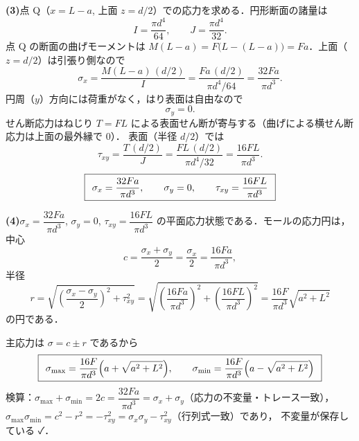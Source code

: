 \documentclass[11pt,a4paper]{article}
\begin{document}
\medskip
\noindent\textbf{(3)}\quad 点 Q（$x=L-a$, 上面 $z=d/2$）での応力を求める．円形断面の諸量は
\[
  I=\frac{\pi d^4}{64},\qquad J=\frac{\pi d^4}{32}.
\]
点 Q の断面の曲げモーメントは $M(L-a)=F\big(L-(L-a)\big)=Fa$．上面（$z=d/2$）は引張り側なので
\[
  \sigma_x=\frac{M(L-a)\,(d/2)}{I}=\frac{Fa\,(d/2)}{\pi d^4/64}=\frac{32Fa}{\pi d^3}.
\]
円周（$y$）方向には荷重がなく，はり表面は自由なので
\[
  \sigma_y=0 .
\]
せん断応力はねじり $T=FL$ による表面せん断が寄与する（曲げによる横せん断応力は上面の最外縁で 0）．
表面（半径 $d/2$）では
\[
  \tau_{xy}=\frac{T\,(d/2)}{J}=\frac{FL\,(d/2)}{\pi d^4/32}=\frac{16FL}{\pi d^3}.
\]
\[
  \boxed{\,\;\sigma_x=\frac{32Fa}{\pi d^3},\qquad \sigma_y=0,\qquad \tau_{xy}=\frac{16FL}{\pi d^3}\;\,}
\]

\medskip
\noindent\textbf{(4)}\quad $\sigma_x=\dfrac{32Fa}{\pi d^3}$, $\sigma_y=0$, $\tau_{xy}=\dfrac{16FL}{\pi d^3}$
の平面応力状態である．モールの応力円は，中心
\[
  c=\frac{\sigma_x+\sigma_y}{2}=\frac{\sigma_x}{2}=\frac{16Fa}{\pi d^3},
\]
半径
\[
  r=\sqrt{\left(\frac{\sigma_x-\sigma_y}{2}\right)^2+\tau_{xy}^2}
   =\sqrt{\left(\frac{16Fa}{\pi d^3}\right)^2+\left(\frac{16FL}{\pi d^3}\right)^2}
   =\frac{16F}{\pi d^3}\sqrt{a^2+L^2}
\]
の円である．

\begin{center}
\end{center}

主応力は $\sigma=c\pm r$ であるから
\[
  \boxed{\,\;\sigma_{\max}=\frac{16F}{\pi d^3}\Big(a+\sqrt{a^2+L^2}\Big),\qquad
        \sigma_{\min}=\frac{16F}{\pi d^3}\Big(a-\sqrt{a^2+L^2}\Big)\;\,}
\]
検算：$\sigma_{\max}+\sigma_{\min}=2c=\dfrac{32Fa}{\pi d^3}=\sigma_x+\sigma_y$（応力の不変量・トレース一致），
$\sigma_{\max}\sigma_{\min}=c^2-r^2=-\tau_{xy}^2=\sigma_x\sigma_y-\tau_{xy}^2$（行列式一致）であり，
不変量が保存している ✓．
\end{document}
